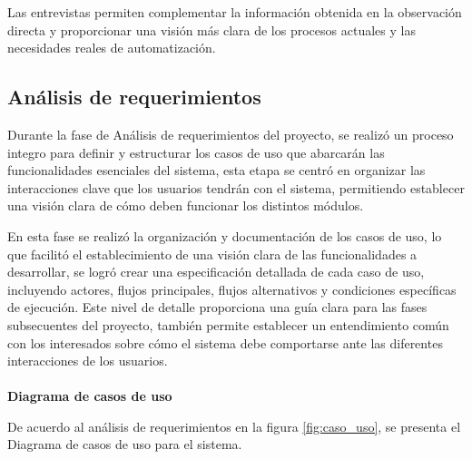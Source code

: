 	Las entrevistas permiten complementar la información obtenida en la observación directa y proporcionar una visión más clara de los procesos actuales y las necesidades reales de automatización.	
	
	\subsection{Análisis de requerimientos}
	Durante la fase de Análisis de requerimientos del proyecto, se realizó un proceso integro para definir y estructurar los casos de uso que abarcarán las funcionalidades esenciales del sistema, esta etapa se centró en organizar las interacciones clave que los usuarios tendrán con el sistema, permitiendo establecer una visión clara de cómo deben funcionar los distintos módulos.
	
	En esta fase se realizó la organización y documentación de los casos de uso, lo que facilitó el establecimiento de una visión clara de las funcionalidades a desarrollar, se logró crear una especificación detallada de cada caso de uso, incluyendo actores, flujos principales, flujos alternativos y condiciones específicas de ejecución. Este nivel de detalle proporciona una guía clara para las fases subsecuentes del proyecto, también permite establecer un entendimiento común con los interesados sobre cómo el sistema debe comportarse ante las diferentes interacciones de los usuarios.\\
	\\
	\textbf{Diagrama de casos de uso}
		
	De acuerdo al análisis de requerimientos en la figura \ref{fig:caso_uso}, se presenta el Diagrama de casos de uso para el sistema.
	
